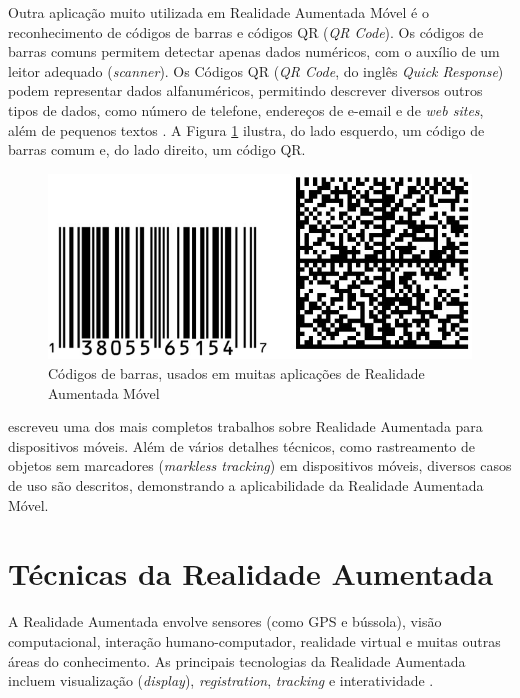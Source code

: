Outra aplicação muito utilizada em Realidade Aumentada Móvel é o reconhecimento de códigos de barras e códigos QR
(\textit{QR Code}). Os códigos de barras comuns permitem detectar apenas dados numéricos, com o auxílio de um
leitor adequado (\textit{scanner}). Os Códigos QR (\textit{QR Code}, do inglês \textit{Quick Response}) podem 
representar dados alfanuméricos, permitindo descrever diversos outros tipos de dados, como número de telefone,
endereços de e-email e de \textit{web sites}, além de pequenos textos \cite{QRCodeSite}. A Figura 
\ref{fig:codigos-barras-qr-code} ilustra, do lado esquerdo, um código de barras comum e, do lado direito, um 
código QR.

\begin{figure}[h!]
    \centering
    \caption{Códigos de barras, usados em muitas aplicações de Realidade Aumentada Móvel}
    \label{fig:codigos-barras-qr-code}
    \includegraphics[width=13cm]{resources/codigo-barras-qr-code.png}
\end{figure}


\cite{HandheldAR} escreveu uma dos mais completos trabalhos sobre Realidade Aumentada para
dispositivos móveis. Além de vários detalhes técnicos, como rastreamento de objetos sem marcadores 
(\textit{markless tracking}) em dispositivos móveis, diversos casos de uso são descritos, demonstrando
a aplicabilidade da Realidade Aumentada Móvel.



\section{Técnicas da Realidade Aumentada}

A Realidade Aumentada envolve sensores (como \gls{GPS} e bússola), visão computacional,
interação humano-computador, realidade virtual e muitas outras áreas do conhecimento.
As principais tecnologias da Realidade Aumentada incluem visualização (\textit{display}),
\textit{registration}, \textit{tracking} e interatividade \cite{ARFeatureMaching}.



